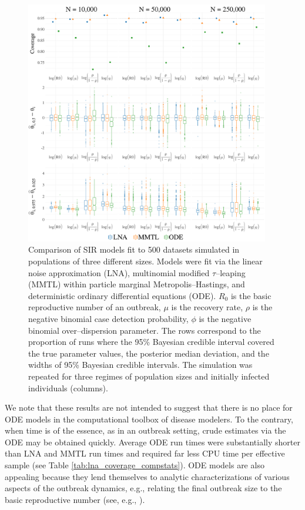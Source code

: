 \begin{figure}[!ht]
	\centering
	\includegraphics[width=0.95\textwidth]{figures/lna_coverage_plots_main}
	\caption{Comparison of SIR models fit to 500 datasets simulated in populations of three different sizes. Models were fit via the linear noise approximation (LNA), multinomial modified $ \tau $--leaping (MMTL) within particle marginal Metropolis--Hastings, and deterministic ordinary differential equations (ODE). $ R_0 $ is the basic reproductive number of an outbreak, $ \mu $ is the recovery rate, $ \rho $ is the negative binomial case detection probability, $ \phi $ is the negative binomial over--dispersion parameter. The rows correspond to the proportion of runs where the 95\% Bayesian credible interval covered the true parameter values, the posterior median deviation, and the widths of 95\% Bayesian credible intervals. The simulation was repeated for three regimes of population sizes and initially infected individuals (columns).}
	\label{fig:lna_coverage_main}
\end{figure}

We note that these results are not intended to suggest that there is no place for ODE models in the computational toolbox of disease modelers. To the contrary, when time is of the essence, as in an outbreak setting, crude estimates via the ODE may be obtained quickly. Average ODE run times were substantially shorter than LNA and MMTL run times and required far less CPU time per effective sample (see Table \ref{tab:lna_coverage_compstats}). ODE models are also appealing because they lend themselves to analytic characterizations of various aspects of the outbreak dynamics, e.g., relating the final outbreak size to the basic reproductive number (see, e.g., \cite{andersson2000stochastic,britton2018,keeling2008}).

